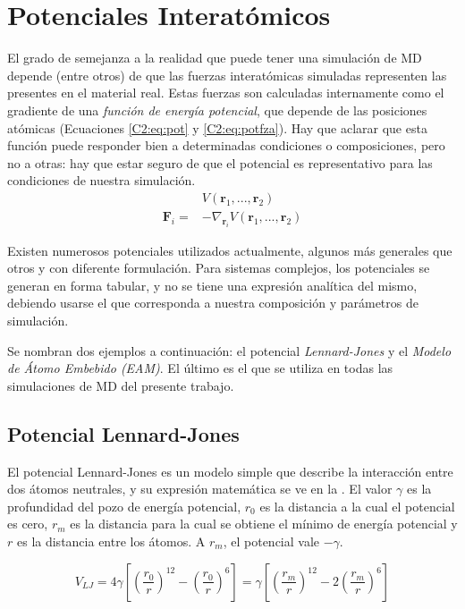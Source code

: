 \section{Potenciales Interatómicos}
\label{S2_3}

El grado de semejanza a la realidad que puede tener una simulación de MD depende (entre otros) de que las fuerzas interatómicas simuladas representen las presentes en el material real. Estas fuerzas son calculadas internamente como el gradiente de una \textit{función de energía potencial}, que depende de las posiciones atómicas (Ecuaciones \ref{C2:eq:pot} y \ref{C2:eq:potfza}). Hay que aclarar que esta función puede responder bien a determinadas condiciones o composiciones, pero no a otras: hay que estar seguro de que el potencial es representativo para las condiciones de nuestra simulación.
\vspace{-0.3pt}
\begin{align}
& V(\mathbf{r}_{1},...,\mathbf{r}_{2})
\label{C2:eq:pot}\\
\mathbf{F}_{i} = & -\nabla_{\mathbf{r}_{i}}V(\mathbf{r}_{1},...,\mathbf{r}_{2})
\label{C2:eq:potfza}
\end{align}

Existen numerosos potenciales utilizados actualmente, algunos más generales que otros y con diferente formulación. Para sistemas complejos, los potenciales se generan en forma tabular, y no se tiene una expresión analítica del mismo, debiendo usarse el que corresponda a nuestra composición y parámetros de simulación.

Se nombran dos ejemplos a continuación: el potencial \textit{Lennard-Jones} y el \textit{Modelo de Átomo Embebido (EAM)}. El último es el que se utiliza en todas las simulaciones de MD del presente trabajo.

\subsection{Potencial Lennard-Jones}
\label{SS2_3_1}

El potencial Lennard-Jones es un modelo simple que describe la interacción entre dos átomos neutrales, y su expresión matemática se ve en la . El valor $\gamma$ es la profundidad del pozo de energía potencial, $r_{0}$ es la distancia a la cual el potencial es cero, $r_{m}$ es la distancia para la cual se obtiene el mínimo de energía potencial y $r$ es la distancia entre los átomos. A $r_{m}$, el potencial vale $-\gamma$.

\begin{equation}
V_{LJ}=4\gamma \left[ \left( \frac{r_{0}}{r} \right)^{12} - \left( \frac{r_{0}}{r} \right)^{6} \right] = 
\gamma \left[ \left( \frac{r_{m}}{r} \right)^{12} -2 \left( \frac{r_{m}}{r} \right)^{6} \right]
\label{eq:LJ}
\end{equation}


